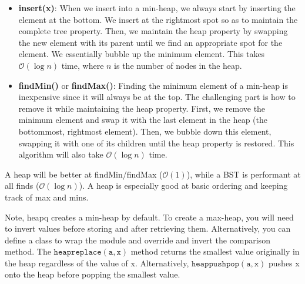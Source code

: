 \documentclass{article}
\newcommand{\bigO}{\mathcal{O}}
\begin{document}
    \begin{itemize}
        \item \textbf{insert(x)}: When we insert into a min-heap, we always start by inserting the element at the bottom. We insert at the rightmost spot so as to maintain the complete tree property. Then, we maintain the heap property by swapping the new element with its parent until we find an appropriate spot for the element. We essentially bubble up the minimum element. This takes $\bigO (\log n)$ time, where $n$ is the number of nodes in the heap. 
        
        \item \textbf{findMin()} or \textbf{findMax()}: Finding the minimum element of a min-heap is inexpensive since it will always be at the top. The challenging part is how to remove it while maintaining the heap property. First, we remove the minimum element and swap it with the last element in the heap (the bottommost, rightmost element). Then, we bubble down this element, swapping it with one of its children until the heap property is restored. This algorithm will also take $\bigO( \log n)$ time. 
    \end{itemize}
    
    A heap will be better at findMin/findMax ($\bigO(1)$), while a BST is performant at all finds ($\bigO(\log n)$). A heap is especially good at basic ordering and keeping track of max and mins.
    
    Note, heapq creates a min-heap by default. To create a max-heap, you will need to invert values before storing and after retrieving them. Alternatively, you can define a class to wrap the module and override and invert the comparison method. The 
    $\mathtt{heapreplace(a, x)}$ method returns the smallest value originally in the heap regardless of the value of x. Alternatively, $\mathtt{heappushpop(a, x)}$ pushes x onto the heap before popping the smallest value.
\end{document}
